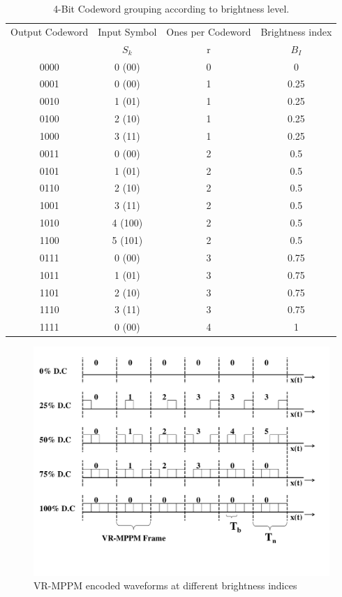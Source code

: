 \begin{table}
\begin{center}
\caption{4-Bit Codeword grouping according to brightness level.}
\begin{tabular}{|c|c|c|c|}
\hline\hline
Output Codeword&Input Symbol&Ones per Codeword& Brightness index\\
 &  $S_k$ & r &  $B_I$ \\
\hline\hline
0000 & 0 (00) & 0 & 0 \\ \hline
0001 & 0 (00) & 1 & 0.25 \\	
0010 & 1 (01) & 1 & 0.25 \\	
0100 & 2 (10) & 1 & 0.25 \\	
1000 & 3 (11) & 1 & 0.25 \\ \hline
0011 & 0 (00) & 2 & 0.5 \\	
0101 & 1 (01) & 2 & 0.5 \\	
0110 & 2 (10) & 2 & 0.5 \\	
1001 & 3 (11) & 2 & 0.5 \\	
1010 & 4 (100) & 2 & 0.5 \\	
1100 & 5 (101) & 2 & 0.5 \\ \hline
0111 & 0 (00) & 3 & 0.75 \\	
1011 & 1 (01) & 3 & 0.75 \\	
1101 & 2 (10) & 3 & 0.75 \\	
1110 & 3 (11) & 3 & 0.75 \\ \hline
1111 & 0 (00) & 4 & 1 \\ \hline
\hline
\end{tabular}
\label{Ta:code_groupings}
\end{center}
\end{table}


\begin{figure}[!htbp]
\centering\includegraphics[width=\textwidth]{./Figures/line_code}
\caption{VR-MPPM encoded waveforms at different brightness indices }
\label{Fig:line_codes}
\end{figure}

